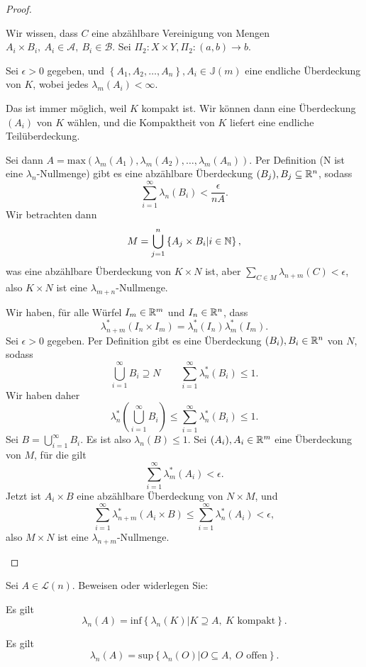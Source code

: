 \begin{proof}
	\begin{parts}
	\item Wir wissen, dass $C$ eine abzählbare Vereinigung von Mengen $A_i\times B_i,~A_i\in \mathcal{A},~B_i\in \mathcal{B}$. Sei $\Pi_2: X \times Y, \Pi_2:(a,b)\to b$. 
	\item Sei $\epsilon>0$ gegeben, und $\left\{ A_1,A_2,\dots,A_n \right\},A_i\in\mathbb{J}(m)$ eine endliche Überdeckung von $K$, wobei jedes $\lambda_m(A_i)<\infty$. 
		\begin{tcolorbox}
			Das ist immer möglich, weil $K$ kompakt ist. Wir können dann eine Überdeckung $(A_i)$ von $K$ wählen, und die Kompaktheit von $K$ liefert eine endliche Teilüberdeckung. 
		\end{tcolorbox}
		Sei dann $A=\text{max}\left( \lambda_m(A_1),\lambda_m(A_2),\dots, \lambda_m(A_n) \right)$. Per Definition (N ist eine $\lambda_n$-Nullmenge) gibt es eine abzählbare Überdeckung $(B_j),B_j\subseteq \mathbb{R}^n$, sodass
		 \[
		\sum_{i=1}^{\infty} \lambda_n(B_i)<\frac{\epsilon}{nA}
		.\] 
		Wir betrachten dann
		\[
		M=\bigcup_{j=1}^n\left\{ A_j\times B_i|i\in \mathbb{N} \right\}  
		,\]
		was eine abzählbare Überdeckung von $K\times N$ ist, aber $\sum_{C\in M}\lambda_{n+m}(C)<\epsilon$, also $K\times N$ ist eine $\lambda_{m+n}$-Nullmenge.
	\item Wir haben, f\"{u}r alle Würfel $I_m\in \mathbb{R}^m$ und $I_n\in \mathbb{R}^n$, dass
		\[
			\lambda_{n+m}^*(I_n\times I_m) =\lambda_n^*(I_n)\lambda_m^*(I_m)
		.\] 
	Sei $\epsilon>0$ gegeben. Per Definition gibt es eine Überdeckung $(B_i),B_i\in \mathbb{R}^n$ von $N$, sodass
	\[
	\bigcup_{i=1} ^\infty B_i\supseteq N\qquad \sum_{i=1}^{\infty} \lambda_n^*(B_i)\le 1
	.\] 
	Wir haben daher
\[
\lambda_n^*\left( \bigcup_{i=1} ^\infty B_i \right) \le \sum_{i=1}^{\infty} \lambda_n^*(B_i)\le 1
.\] 
Sei $B=\bigcup_{i=1}^\infty B_i$. Es ist also $\lambda_n(B)\le 1$. Sei $(A_i),A_i\in \mathbb{R}^m$ eine Überdeckung von $M$, f\"{u}r die gilt
	\[
	\sum_{i=1}^{\infty} \lambda_m^*(A_i)<\epsilon
	.\] 
	Jetzt ist $A_i\times B$ eine abzählbare Überdeckung von $N\times M$, und
	\[
		\sum_{i=1}^\infty\lambda_{n+m}^*(A_i\times B)\le \sum_{i=1}^\infty \lambda_n^*(A_i)<\epsilon
	,\]
	also $M\times N$ ist eine $\lambda_{n+m}$-Nullmenge.
	\end{parts}
\end{proof}
\begin{Problem}
	Sei $A\in \mathcal{L}(n)$. Beweisen oder widerlegen Sie:
	\begin{parts}
	\item Es gilt
		\[
			\lambda_n(A)=\text{inf}\left\{ \lambda_n(K)|K\supseteq A,~K\text{ kompakt} \right\} 
		.\] 
	\item Es gilt
		\[
			\lambda_n(A)=\text{sup}\left\{ \lambda_n(O)|O\subseteq A,~O\text{ offen} \right\} 
		.\] 
	\end{parts}
\end{Problem}
